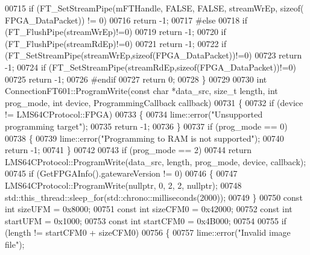 \begin{DoxyCode}
{{{{{00715     \textcolor{keywordflow}{if} (FT\_SetStreamPipe(mFTHandle, FALSE, FALSE, streamWrEp, \textcolor{keyword}{sizeof}(
      FPGA_DataPacket)) != 0)
00716         \textcolor{keywordflow}{return} -1;
00717 \textcolor{preprocessor}{#else}
00718     \textcolor{keywordflow}{if} (FT\_FlushPipe(streamWrEp)!=0)
00719         \textcolor{keywordflow}{return} -1;
00720     \textcolor{keywordflow}{if} (FT\_FlushPipe(streamRdEp)!=0)
00721         \textcolor{keywordflow}{return} -1;
00722     \textcolor{keywordflow}{if} (FT\_SetStreamPipe(streamWrEp,\textcolor{keyword}{sizeof}(FPGA_DataPacket))!=0)
00723         \textcolor{keywordflow}{return} -1;
00724     \textcolor{keywordflow}{if} (FT\_SetStreamPipe(streamRdEp,\textcolor{keyword}{sizeof}(FPGA_DataPacket))!=0)
00725         \textcolor{keywordflow}{return} -1;
00726 \textcolor{preprocessor}{#endif}
00727     \textcolor{keywordflow}{return} 0;
00728 \}
00729 
00730 \textcolor{keywordtype}{int} ConnectionFT601::ProgramWrite(\textcolor{keyword}{const} \textcolor{keywordtype}{char} *data\_src, \textcolor{keywordtype}{size\_t} length, \textcolor{keywordtype}{int} prog\_mode, \textcolor{keywordtype}{int} 
      device, ProgrammingCallback callback)
00731 \{
00732     \textcolor{keywordflow}{if} (device != LMS64CProtocol::FPGA)
00733     \{
00734         lime::error(\textcolor{stringliteral}{"Unsupported programming target"});
00735         \textcolor{keywordflow}{return} -1;
00736     \}
00737     \textcolor{keywordflow}{if} (prog\_mode == 0)
00738     \{
00739         lime::error(\textcolor{stringliteral}{"Programming to RAM is not supported"});
00740         \textcolor{keywordflow}{return} -1;
00741     \}
00742 
00743     \textcolor{keywordflow}{if} (prog\_mode == 2)
00744         \textcolor{keywordflow}{return} LMS64CProtocol::ProgramWrite(data\_src, length, prog\_mode, device, callback);
00745     \textcolor{keywordflow}{if} (GetFPGAInfo().gatewareVersion != 0)
00746     \{
00747         LMS64CProtocol::ProgramWrite(\textcolor{keyword}{nullptr}, 0, 2, 2, \textcolor{keyword}{nullptr});
00748         std::this\_thread::sleep\_for(std::chrono::milliseconds(2000));
00749     \}
00750     \textcolor{keyword}{const} \textcolor{keywordtype}{int} sizeUFM = 0x8000;
00751     \textcolor{keyword}{const} \textcolor{keywordtype}{int} sizeCFM0 = 0x42000;
00752     \textcolor{keyword}{const} \textcolor{keywordtype}{int} startUFM = 0x1000;
00753     \textcolor{keyword}{const} \textcolor{keywordtype}{int} startCFM0 = 0x4B000;
00754 
00755     \textcolor{keywordflow}{if} (length != startCFM0 + sizeCFM0)
00756     \{
00757         lime::error(\textcolor{stringliteral}{"Invalid image file"});
}}}}}
\end{DoxyCode}
